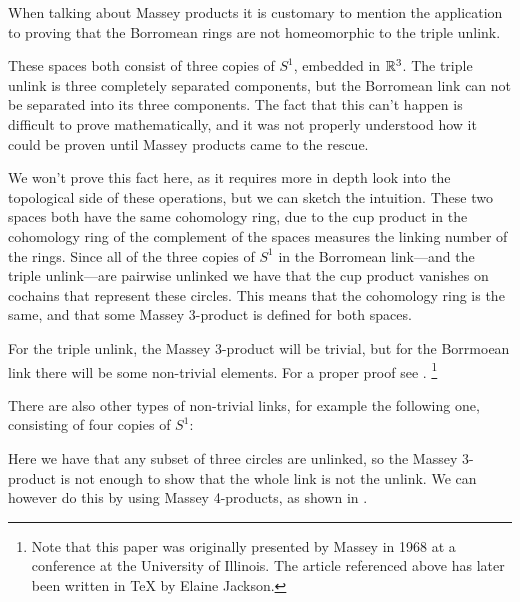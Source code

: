 \begin{example}
\label{ex:borromean_rings}
When talking about Massey products it is customary to mention the application to proving that the Borromean rings are not homeomorphic to the triple unlink. 

\begin{center}
\def\svgwidth{0.8\textwidth}

\end{center}

These spaces both consist of three copies of $S^1$, embedded in $\mathbb{R}^3$. The triple unlink is three completely separated components, but the Borromean link can not be separated into its three components. The fact that this can't happen is difficult to prove mathematically, and it was not properly understood how it could be proven until Massey products came to the rescue. 

We won't prove this fact here, as it requires more in depth look into the topological side of these operations, but we can sketch the intuition. These two spaces both have the same cohomology ring, due to the cup product in the cohomology ring of the complement of the spaces measures the linking number of the rings. Since all of the three copies of $S^1$ in the Borromean link---and the triple unlink---are pairwise unlinked we have that the cup product vanishes on cochains that represent these circles. This means that the cohomology ring is the same, and that some Massey $3$-product is defined for both spaces. 

For the triple unlink, the Massey 3-product will be trivial, but for the Borrmoean link there will be some non-trivial elements. For a proper proof see \cite{linking}. \footnote{Note that this paper was originally presented by Massey in 1968 at a conference at the University of Illinois. The article referenced above has later been written in \TeX{} by Elaine Jackson.}
\end{example}

\begin{example}
There are also other types of non-trivial links, for example the following one, consisting of four copies of $S^1$:

\begin{center}
\def\svgwidth{0.7\textwidth}

\end{center}

Here we have that any subset of three circles are unlinked, so the Massey 3-product is not enough to show that the whole link is not the unlink. We can however do this by using Massey 4-products, as shown in \cite{four-link}. 
\end{example}



